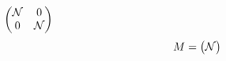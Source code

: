\(\begin{pmatrix}\flmUDcalN & 0\\ 0 & \flmUDcalN\end{pmatrix}\)
\begin{align}
  M &= \begin{pmatrix} \flmUDcalN \end{pmatrix}
\end{align}
\RequirePackage{amsmath}
\providecommand\flmUDcalN{\mathcal{N}}
\endinput
